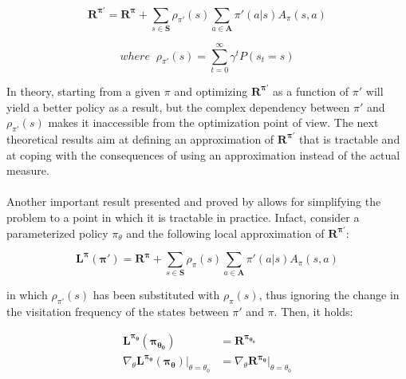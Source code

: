                 \[ \mathbf{R^{\pi'}} = \mathbf{R^{\pi}} + \sum_{s \in \mathbf{S}} \rho_{\pi'}(s) \sum_{a \in \mathbf{A}} \pi'(a|s) A_{\pi}(s,a) \]
            
                \[ where \; \;\rho_{\pi'}(s) = \sum_{t=0}^{\infty} \gamma^t P(s_t = s)\]
                
                In theory, starting from a given $\pi$ and optimizing $\mathbf{R^{\pi'}}$ as a function of $\pi'$ will yield a better policy as a result, but the complex dependency between $\pi'$ and $\rho_{\pi'}(s)$ makes it inaccessible from the optimization point of view. The next theoretical results aim at defining an approximation of $\mathbf{R^{\pi'}}$ that is tractable and at coping with the consequences of using an approximation instead of the actual measure.
                \\\\
                Another important result presented and proved by  allows for simplifying the problem to a point in which it is tractable in practice. Infact, consider a parameterized policy $\pi_\theta$ and the following local approximation of $\mathbf{R^{\pi'}}$:
                
                \begin{definition}
                    \label{def:r_approximated}
                    \[ \mathbf{L^{\pi}(\pi')} = \mathbf{R^{\pi}} + \sum_{s \in \mathbf{S}} \rho_{\pi}(s) \sum_{a \in \mathbf{A}} \pi'(a|s) A_{\pi}(s,a) \]
                \end{definition}
                
                in which $\rho_{\pi'}(s)$ has been substituted with $\rho_{\pi}(s)$, thus ignoring the change in the visitation frequency of the states between $\pi'$ and $\pi$. Then, it holds:
                
                \begin{align}
                    \mathbf{L^{\pi_\theta}(\pi_{\theta_0})} &= \mathbf{R^{\pi_{\theta_0}}}\\
                    \nabla_\theta \mathbf{L^{\pi_\theta}(\pi_\theta)} \biggr\rvert_{\theta = \theta_0} &= \nabla_\theta \mathbf{R^{\pi_\theta}} \biggr\rvert_{\theta = \theta_0}\nonumber
                \end{align}

